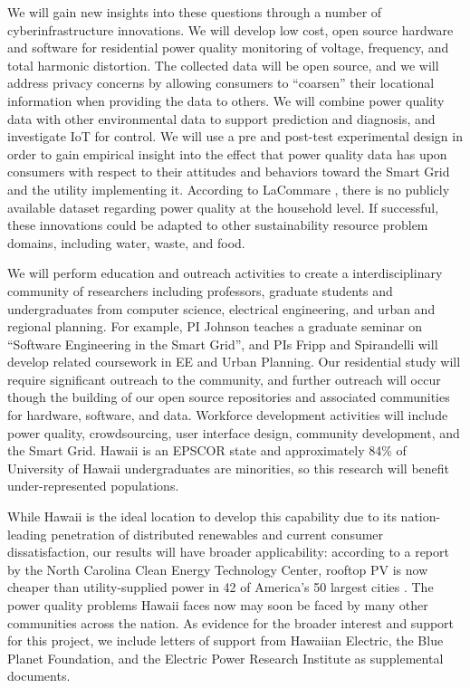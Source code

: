 We will gain new insights into these questions through a number of cyberinfrastructure innovations.  We will develop low cost, open source hardware and software for residential power quality monitoring of voltage, frequency, and total harmonic distortion. The collected data will be open source, and we will address privacy concerns by allowing consumers to ``coarsen'' their locational information when providing the data to others.  We will combine power quality data with other environmental data to support prediction and diagnosis, and investigate IoT for control.  We will use a pre and post-test experimental design in order to gain empirical insight into the effect that power quality data has upon consumers with respect to their attitudes and behaviors toward the Smart Grid and the utility implementing it.  According to LaCommare \cite{LaCommare2004}, there is no publicly available dataset regarding power quality at the household level. If successful, these innovations could be adapted
to other sustainability resource problem domains, including water, waste, and food.

We will perform education and outreach activities to create a interdisciplinary community of researchers including professors, graduate students and undergraduates from computer science, electrical engineering, and urban and regional planning.  For example, PI Johnson teaches a graduate seminar on ``Software Engineering in the Smart Grid'', and PIs Fripp and Spirandelli will develop related coursework in EE and Urban Planning. Our residential study will require significant outreach to the community, and further outreach will occur though the building of our open source repositories and associated communities for hardware, software, and data. Workforce development activities will include power quality, crowdsourcing, user interface design, community development, and the Smart Grid. Hawaii is an EPSCOR state and approximately 84\% of University of Hawaii undergraduates are minorities, so this research will benefit under-represented populations.

While Hawaii is the ideal location to develop this capability due to its nation-leading penetration of distributed renewables and current consumer dissatisfaction, our results will have broader applicability: according to a report by the North Carolina Clean Energy Technology Center, rooftop PV is now cheaper than utility-supplied power in 42 of America's 50 largest cities \cite{Kennerly2015}. The power quality problems Hawaii faces now may soon be faced by many other communities across the nation. As evidence for the broader interest and support for this project, we include letters of support from Hawaiian Electric, the Blue Planet Foundation, and the Electric Power Research Institute as supplemental documents. 





